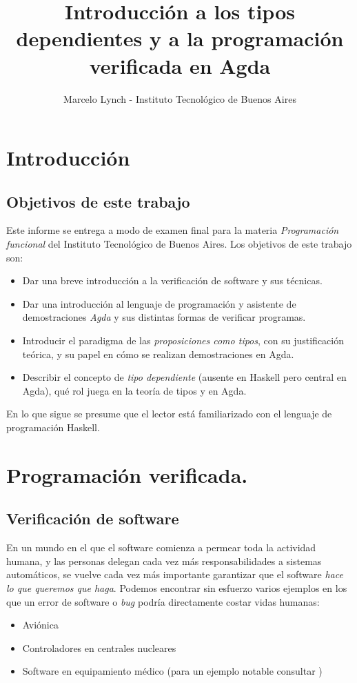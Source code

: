 \documentclass[11pt]{article} %
\title{Introducción a los tipos dependientes y a la programación verificada en Agda}
\author{Marcelo Lynch - Instituto Tecnológico de Buenos Aires}
\date{} %
\begin{document}
\maketitle
\tableofcontents
\newpage
\section{Introducción}
\subsection{Objetivos de este trabajo}
Este informe se entrega a modo de examen final para la materia \textit{Programación funcional} del Instituto Tecnológico de Buenos Aires. Los objetivos de este trabajo son:
\begin{itemize}
    \item Dar una breve introducción a la verificación de software y sus técnicas.
    \item Dar una introducción al lenguaje de programación y asistente de demostraciones \textit{Agda} y sus distintas formas de verificar programas.
    \item Introducir el paradigma de las \textit{proposiciones como tipos}, con su justificación teórica, y su papel en cómo se realizan demostraciones en Agda.
    \item Describir el concepto de \textit{tipo dependiente} (ausente en Haskell pero central en Agda), qué rol juega en la teoría de tipos y en Agda.
\end{itemize}

En lo que sigue se presume que el lector está familiarizado con el lenguaje de programación Haskell.


\section{Programación verificada.}
\subsection{Verificación de software} 
En un mundo en el que el software comienza a permear toda la actividad humana, y las personas delegan cada vez más responsabilidades a sistemas automáticos, se vuelve cada vez más importante garantizar que el software \textit{hace lo que queremos que haga}. Podemos encontrar sin esfuerzo varios ejemplos en los que un error de software o \textit{bug} podría directamente costar vidas humanas:

\begin{itemize}
    \item Aviónica
    \item Controladores en centrales nucleares
    \item Software en equipamiento médico (para un ejemplo notable consultar \cite{leveson1993investigation})
\end{itemize}
\end{document}
